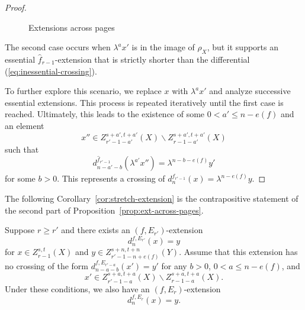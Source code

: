 \begin{proof}
\begin{figure}[h]
{}
    \caption{Extensions across pages}\label{fig:ext-across-pages}
    \end{figure}
    
    The second case occurs when $\lambda^ax'$ is in the image of $\rho_X$, but it supports an essential $\hat f_{r-1}$-extension that is strictly shorter than the differential (\ref{eq:inessential-crossing}). 
    
    To further explore this scenario, we replace $x$ with $\lambda^ax'$ and analyze successive essential extensions. This process is repeated iteratively until the first case is reached. Ultimately, this leads to the existence of some $0<a'\le n-e(f)$ and an element
    $$x''\in Z_{r'-1-a'}^{s+a',t+a'}(X)\backslash Z_{r-1-a'}^{s+a',t+a'}(X)$$
    such that
    $$d^{\hat f_{r'-1}}_{n-a'-b}(\lambda^{a'} x'')=\lambda^{n-b-e(f)} y'$$
    for some $b>0$. This represents a crossing of $d^{\hat f_{r'-1}}_n(x)=\lambda^{n-e(f)}y$.
    
\end{proof}


The following Corollary~\ref{cor:stretch-extension} is the contrapositive statement of the second part of Proposition~\ref{prop:ext-across-pages}.


\begin{corollary}\label{cor:stretch-extension}
    Suppose $r\ge r'$ and there exists an $(f,E_{r'})$-extension
    $$d^{f,E_{r'}}_n(x)=y$$
    for $x\in Z_{r-1}^{s,t}(X)$ and $y\in Z_{r'-1-n+e(f)}^{s+n,t+n}(Y)$. Assume that this extension has no crossing of the form $d^{f,E_{r'-a}}_{n-a-b}(x')=y'$ for any $b>0$, $0<a\le n-e(f)$, and
    $$x'\in Z_{r'-1-a}^{s+a,t+a}(X)\backslash Z_{r-1-a}^{s+a,t+a}(X).$$
    Under these conditions, we also have an $(f,E_{r})$-extension
    $$d^{f,E_{r}}_n(x)=y.$$
\end{corollary}

